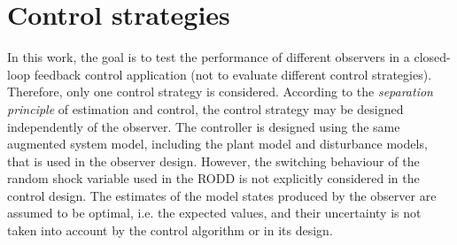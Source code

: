 {%
%
%


\section{Control strategies}

In this work, the goal is to test the performance of different observers in a closed-loop feedback control application (not to evaluate different control strategies). Therefore, only one control strategy is considered. According to the \textit{separation principle} of estimation and control, the control strategy may be designed independently of the observer. The controller is designed using the same augmented system model, including the plant model and disturbance models, that is used in the observer design. However, the switching behaviour of the random shock variable used in the \gls{RODD} is not explicitly considered in the control design. The estimates of the model states produced by the observer are assumed to be optimal, i.e. the expected values, and their uncertainty is not taken into account by the control algorithm or in its design.


}

